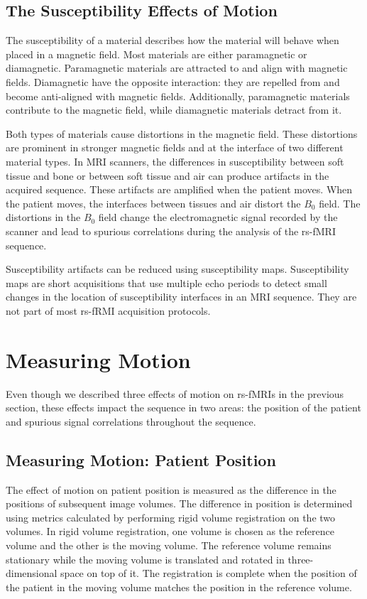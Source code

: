 \subsection{The Susceptibility Effects of Motion}

The susceptibility of a material describes how the material will behave when placed in a magnetic field. Most materials are either paramagnetic or diamagnetic. Paramagnetic materials are attracted to and align with magnetic fields. Diamagnetic have the opposite interaction: they are repelled from and become anti-aligned with magnetic fields. Additionally, paramagnetic materials contribute to the magnetic field, while diamagnetic materials detract from it. 

Both types of materials cause distortions in the magnetic field. These distortions are prominent in stronger magnetic fields and at the interface of two different material types. In MRI scanners, the differences in susceptibility between soft tissue and bone or between soft tissue and air can produce artifacts in the acquired sequence. These artifacts are amplified when the patient moves. When the patient moves, the interfaces between tissues and air distort the $B_0$ field. The distortions in the $B_0$ field change the electromagnetic signal recorded by the scanner and lead to spurious correlations during the analysis of the rs-fMRI sequence.

Susceptibility artifacts can be reduced using susceptibility maps. Susceptibility maps are short acquisitions that use multiple echo periods to detect small changes in the location of susceptibility interfaces in an MRI sequence. They are not part of most rs-fRMI acquisition protocols.

\section{Measuring Motion}

Even though we described three effects of motion on rs-fMRIs in the previous section, these effects impact the sequence in two areas: the position of the patient and spurious signal correlations throughout the sequence.

\subsection{Measuring Motion: Patient Position} 

The effect of motion on patient position is measured as the difference in the positions of subsequent image volumes. The difference in position is determined using metrics calculated by performing rigid volume registration on the two volumes. 
In rigid volume registration, one volume is chosen as the reference volume and the other is the moving volume. The reference volume remains stationary while the moving volume is translated and rotated in three-dimensional space on top of it. The registration is complete when the position of the patient in the moving volume matches the position in the reference volume. 

